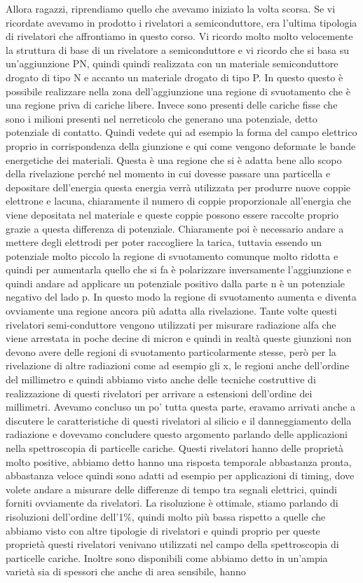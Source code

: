 Allora ragazzi, riprendiamo quello che avevamo iniziato la volta scorsa. Se vi ricordate avevamo in prodotto i rivelatori a semiconduttore, era l'ultima tipologia di rivelatori che affrontiamo in questo corso. Vi ricordo molto molto velocemente la struttura di base di un rivelatore a semiconduttore e vi ricordo che si basa su un'aggiunzione PN, quindi quindi realizzata con un materiale semiconduttore drogato di tipo N e accanto un materiale drogato di tipo P. In questo questo è possibile realizzare nella zona dell'aggiunzione una regione di svuotamento che è una regione priva di cariche libere. Invece sono presenti delle cariche fisse che sono i milioni presenti nel nerreticolo che generano una potenziale, detto potenziale di contatto. Quindi vedete qui ad esempio la forma del campo elettrico proprio in corrispondenza della giunzione e qui come vengono deformate le bande energetiche dei materiali. Questa è una regione che si è adatta bene allo scopo della rivelazione perché nel momento in cui dovesse passare una particella e depositare dell'energia questa energia verrà utilizzata per produrre nuove coppie elettrone e lacuna, chiaramente il numero di coppie proporzionale all'energia che viene depositata nel materiale e queste coppie possono essere raccolte proprio grazie a questa differenza di potenziale. Chiaramente poi è necessario andare a mettere degli elettrodi per poter raccogliere la tarica, tuttavia essendo un potenziale molto piccolo la regione di svuotamento comunque molto ridotta e quindi per aumentarla quello che si fa è polarizzare inversamente l'aggiunzione e quindi andare ad applicare un potenziale positivo dalla parte n è un potenziale negativo del lado p. In questo modo la regione di svuotamento aumenta e diventa ovviamente una regione ancora più adatta alla rivelazione. Tante volte questi rivelatori semi-conduttore vengono utilizzati per misurare radiazione alfa che viene arrestata in poche decine di micron e quindi in realtà queste giunzioni non devono avere delle regioni di svuotamento particolarmente stesse, però per la rivelazione di altre radiazioni come ad esempio gli x, le regioni anche dell'ordine del millimetro e quindi abbiamo visto anche delle tecniche costruttive di realizzazione di questi rivelatori per arrivare a estensioni dell'ordine dei millimetri. Avevamo concluso un po' tutta questa parte, eravamo arrivati anche a discutere le caratteristiche di questi rivelatori al silicio e il danneggiamento della radiazione e dovevamo concludere questo argomento parlando delle applicazioni nella spettroscopia di particelle cariche. Questi rivelatori hanno delle proprietà molto positive, abbiamo detto hanno una risposta temporale abbastanza pronta, abbastanza veloce quindi sono adatti ad esempio per applicazioni di timing, dove volete andare a misurare delle differenze di tempo tra segnali elettrici, quindi forniti ovviamente da rivelatori. La risoluzione è ottimale, stiamo parlando di risoluzioni dell'ordine dell'1\%, quindi molto più bassa rispetto a quelle che abbiamo visto con altre tipologie di rivelatori e quindi proprio per queste proprietà questi rivelatori venivano utilizzati nel campo della spettroscopia di particelle cariche. Inoltre sono disponibili come abbiamo detto in un'ampia varietà sia di spessori che anche di area sensibile, hanno 